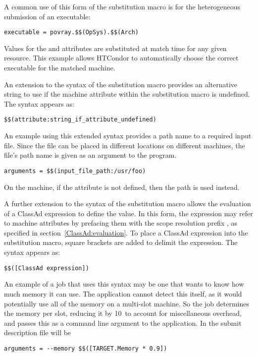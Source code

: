 \begin{description}
A common use of this form of the substitution macro is for the heterogeneous
submission of an executable:
\begin{verbatim}
executable = povray.$$(OpSys).$$(Arch)
\end{verbatim}
Values for the  and  attributes are substituted at
match time for any given resource. This example allows HTCondor to automatically
choose the correct executable for the matched machine.

An extension to the syntax of the substitution macro provides an
alternative string to use if the machine attribute within the
substitution macro is undefined.
The syntax appears as:
\begin{verbatim} 
$$(attribute:string_if_attribute_undefined)
\end{verbatim}

An example using this extended syntax provides a path name to a
required input file.
Since the file can be placed in different locations on
different machines, the file's path name is given as an argument
to the program.
\begin{verbatim} 
arguments = $$(input_file_path:/usr/foo)
\end{verbatim}
On the machine, if the attribute  is not
defined, then the path  is used instead.

A further extension to the syntax of the substitution macro allows the
evaluation of a ClassAd expression to define the value.
In this form, the expression may refer to machine attributes
by prefacing them with the scope resolution prefix ,
as specified in section~\ref{ClassAd:evaluation}.
To place a ClassAd expression into the substitution macro,
square brackets are added to delimit the expression.
The syntax appears as:
\begin{verbatim} 
$$([ClassAd expression])
\end{verbatim}
An example of a job that uses this syntax may be one that
wants to know how much memory it can use. 
The application cannot detect this itself, as it would potentially use
all of the memory on a multi-slot machine.
So the job determines the memory per slot, 
reducing it by 10\Percent\
to account for miscellaneous overhead,
and passes this as a command line argument to the application.
In the submit description file will be
\begin{verbatim} 
arguments = --memory $$([TARGET.Memory * 0.9])
\end{verbatim}


\end{description}
